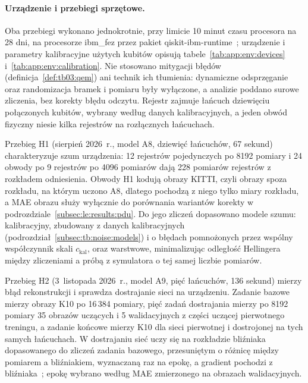 \paragraph{Urządzenie i przebiegi sprzętowe.}\label{par:le:hardware}
Oba przebiegi wykonano jednokrotnie, przy limicie 10 minut czasu procesora na 28 dni, na procesorze ibm\_fez przez pakiet qiskit-ibm-runtime~\cite{qiskit_ibm_runtime_2026}; urządzenie i parametry kalibracyjne użytych kubitów opisują tabele~\ref{tab:app:env:devices} i~\ref{tab:app:env:calibration}.
Nie stosowano mitygacji błędów (definicja~\ref{def:tb03:qem}) ani technik ich tłumienia: dynamiczne odsprzęganie oraz randomizacja bramek i pomiaru były wyłączone, a analizie poddano surowe zliczenia, bez korekty błędu odczytu.
Rejestr zajmuje łańcuch dziewięciu połączonych kubitów, wybrany według danych kalibracyjnych, a jeden obwód fizyczny niesie kilka rejestrów na rozłącznych łańcuchach.

Przebieg H1 (sierpień 2026~r., model A8, dziewięć łańcuchów, 67 sekund) charakteryzuje szum urządzenia: 12 rejestrów pojedynczych po 8192 pomiary i 24 obwody po 9 rejestrów po 4096 pomiarów dają 228 pomiarów rejestrów z rozkładem odniesienia.
Obwody H1 kodują obrazy KITTI, czyli obrazy spoza rozkładu, na którym uczono A8, dlatego pochodzą z niego tylko miary rozkładu, a MAE obrazu służy wyłącznie do porównania wariantów korekty w podrozdziale~\ref{subsec:le:results:pdu}.
Do jego zliczeń dopasowano modele szumu: kalibracyjny, zbudowany z danych kalibracyjnych (podrozdział~\ref{subsec:tb:noise:models}) i o błędach pomnożonych przez wspólny współczynnik skali $c_{\mathrm{kal}}$, oraz warstwowe, minimalizując odległość Hellingera między zliczeniami a próbą z symulatora o tej samej liczbie pomiarów.

Przebieg H2 (3~listopada 2026~r., model A9, pięć łańcuchów, 136 sekund) mierzy błąd rekonstrukcji i sprawdza dostrajanie sieci na urządzeniu.
Zadanie bazowe mierzy obrazy K10 po 16\,384 pomiary, pięć zadań dostrajania mierzy po 8192 pomiary 35 obrazów uczących i 5 walidacyjnych z części uczącej pierwotnego treningu, a zadanie końcowe mierzy K10 dla sieci pierwotnej i dostrojonej na tych samych łańcuchach.
W dostrajaniu sieć uczy się na rozkładzie bliźniaka dopasowanego do zliczeń zadania bazowego, przesuniętym o różnicę między pomiarem a bliźniakiem, wyznaczaną raz na epokę, a gradient pochodzi z bliźniaka~\cite{wright_deep_2022}; epokę wybrano według MAE zmierzonego na obrazach walidacyjnych.

